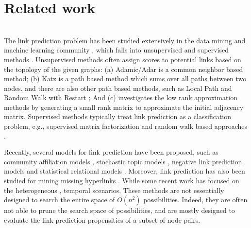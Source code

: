 \section{Related work}
\label{sec-related}

\\




The link prediction problem has been studied extensively in the data mining and machine learning community
\cite{kleinberg,linyuan-2011}, which falls into unsupervised and supervised methods \cite{propflow}. Unsupervised methods
often assign scores to potential links based on the topology of the given graphs:
(a) Adamic/Adar \cite{adamic} is a common neighbor based method; (b) Katz \cite{katz-1953} is a
path based method which sums over all paths between two nodes, and there are also other path based
methods, such as Local Path and Random Walk with Restart \cite{linyuan-2011}; And (c)
 investigates the low rank approximation methods by generating a
small rank matrix to approximate the initial adjacency matrix. Supervised methods
typically treat link prediction as a classification problem, e.g., supervised matrix factorization and random walk based approaches \cite{menon,back}.

Recently, several models for link prediction have been proposed,
such as  community affiliation models \cite{yang-wsdm2013}, stochastic topic models \cite{barbieri2014},
negative link prediction models \cite{tang2015} and statistical relational models \cite{bilgic,Getoor01,Getoor02}. 
Moreover, link prediction has also been studied for mining
missing hyperlinks \cite{west2015}.
While some recent work has focused on the heterogeneous \cite{yang}, temporal \cite{back,dwang} scenarios, 
These methods are not essentially
designed to search the entire space of $O(n^2)$ possibilities. Indeed, they are often not able to prune the search space of possibilities, and are mostly designed to evaluate the link prediction propensities of a subset of node pairs.

